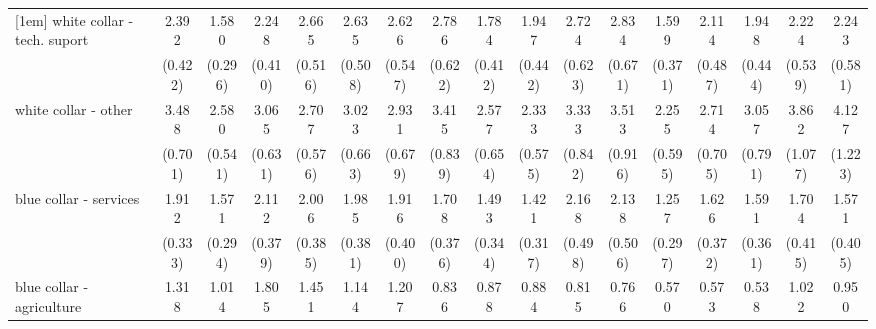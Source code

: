 {\begin{tabular}{l*{16}{c}}
[1em]
white collar - tech. suport&       2.392\sym{***}&       1.580\sym{*}  &       2.248\sym{***}&       2.665\sym{***}&       2.635\sym{***}&       2.626\sym{***}&       2.786\sym{***}&       1.784\sym{*}  &       1.947\sym{**} &       2.724\sym{***}&       2.834\sym{***}&       1.599\sym{*}  &       2.114\sym{**} &       1.948\sym{**} &       2.224\sym{***}&       2.243\sym{**} \\
                    &     (0.422)         &     (0.296)         &     (0.410)         &     (0.516)         &     (0.508)         &     (0.547)         &     (0.622)         &     (0.412)         &     (0.442)         &     (0.623)         &     (0.671)         &     (0.371)         &     (0.487)         &     (0.444)         &     (0.539)         &     (0.581)         \\
[1em]
white collar - other&       3.488\sym{***}&       2.580\sym{***}&       3.065\sym{***}&       2.707\sym{***}&       3.023\sym{***}&       2.931\sym{***}&       3.415\sym{***}&       2.577\sym{***}&       2.333\sym{***}&       3.333\sym{***}&       3.513\sym{***}&       2.255\sym{**} &       2.714\sym{***}&       3.057\sym{***}&       3.862\sym{***}&       4.127\sym{***}\\
                    &     (0.701)         &     (0.541)         &     (0.631)         &     (0.576)         &     (0.663)         &     (0.679)         &     (0.839)         &     (0.654)         &     (0.575)         &     (0.842)         &     (0.916)         &     (0.595)         &     (0.705)         &     (0.791)         &     (1.077)         &     (1.223)         \\
[1em]
blue collar - services&       1.912\sym{***}&       1.571\sym{*}  &       2.112\sym{***}&       2.006\sym{***}&       1.985\sym{***}&       1.916\sym{**} &       1.708\sym{*}  &       1.493         &       1.421         &       2.168\sym{***}&       2.138\sym{**} &       1.257         &       1.626\sym{*}  &       1.591\sym{*}  &       1.704\sym{*}  &       1.571         \\
                    &     (0.333)         &     (0.294)         &     (0.379)         &     (0.385)         &     (0.381)         &     (0.400)         &     (0.376)         &     (0.344)         &     (0.317)         &     (0.498)         &     (0.506)         &     (0.297)         &     (0.372)         &     (0.361)         &     (0.415)         &     (0.405)         \\
[1em]
blue collar - agriculture&       1.318         &       1.014         &       1.805\sym{*}  &       1.451         &       1.144         &       1.207         &       0.836         &       0.878         &       0.884         &       0.815         &       0.766         &       0.570         &       0.573         &       0.538         &       1.022         &       0.950         \\

\end{tabular}}
